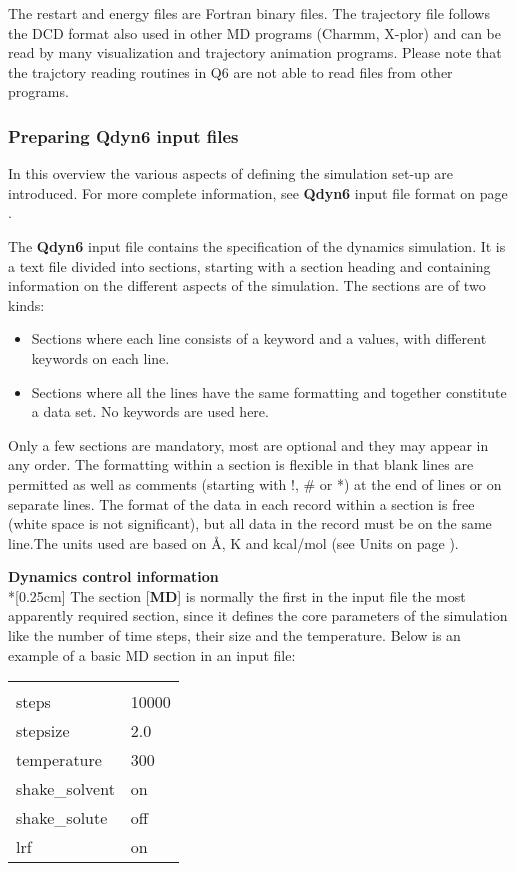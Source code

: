 \documentclass[a4paper,11pt]{article}
\begin{document}
The restart and energy files are Fortran binary files. The
trajectory file follows the DCD format also used in other MD
programs (Charmm, X-plor) and can be read by many visualization
and trajectory animation programs. Please note that the trajctory
reading routines in Q6 are not able to read files from other programs.

\subsubsection{Preparing \textbf{Qdyn6} input files}\label{subsubsec:prep_qdyn_inp_f}
In this overview the various aspects of defining the simulation
set-up are introduced. For more complete information, see \textbf{Qdyn6}
input file format on page \pageref{subsubsec:qdyn_inp_file_form}.

The \textbf{Qdyn6} input file contains the specification of the dynamics
simulation. It is a text file divided into sections, starting with
a section heading and containing information on the different
aspects of the simulation. The sections are of two kinds:

\begin{itemize}
\item Sections where each line consists of a keyword and a values, with
different keywords on each line.
\item Sections where all the lines
have the same formatting and together constitute a data set. No
keywords are used here.
\end{itemize}

Only a few sections are mandatory, most are optional and they may
appear in any order. The formatting within a section is flexible
in that blank lines are permitted as well as comments (starting
with !, {\#} or *) at the end of lines or on separate lines. The
format of the data in each record within a section is free (white
space is not significant), but all data in the record must be on
the same line.The units used are based on {\AA}, K and kcal/mol
(see Units on page \pageref{subsec:units}).

\textbf{Dynamics control information}\\*[0.25cm] The section
[\textbf{MD}] is normally the first in the input file the most
apparently required section, since it defines the core parameters
of the simulation like the number of time steps, their size and
the temperature. Below is an example of a basic MD section in an
input file:

\begin{center}
\begin{tabularx}{\textwidth}{|l X|}
  \hline
  [MD]             & \\
  steps            & 10000 \\
  stepsize         & 2.0 \\
  temperature      & 300 \\
  shake{\_}solvent & on \\
  shake{\_}solute  & off \\
  lrf              & on \\ \hline
\end{tabularx}
\end{center}
\end{document}

